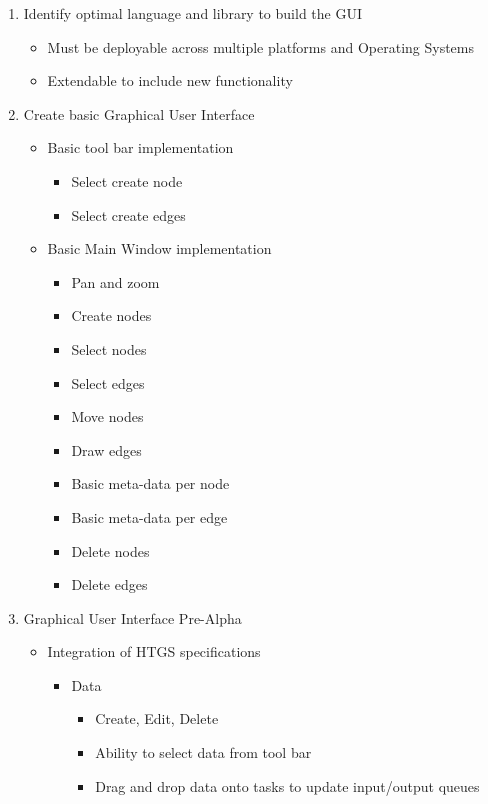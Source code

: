 \documentclass[]{article}
\begin{document}
\begin{enumerate}
  \item Identify optimal language and library to build the GUI
	\begin{itemize}
    \item Must be deployable across multiple platforms and Operating Systems
    \item Extendable to include new functionality
    \end{itemize}
  \item Create basic Graphical User Interface
    \begin{itemize}
    \item Basic tool bar implementation
      \begin{itemize}
      \item Select create node
      \item Select create edges
      \end{itemize}
    \item Basic Main Window implementation
      \begin{itemize}
      \item Pan and zoom
      \item Create nodes
      \item Select nodes
      \item Select edges
      \item Move nodes
      \item Draw edges
      \item Basic meta-data per node
      \item Basic meta-data per edge
      \item Delete nodes
      \item Delete edges
      \end{itemize}
    \end{itemize}
  \item Graphical User Interface Pre-Alpha
    \begin{itemize}
	\item Integration of HTGS specifications
	  \begin{itemize}
	  \item Data
	  	\begin{itemize}
	  	\item Create, Edit, Delete
	  	\item Ability to select data from tool bar
	  	\item Drag and drop data onto tasks to update input/output queues
	  	\end{itemize}

\end{itemize}
\end{itemize}
\end{enumerate}
\end{document}
